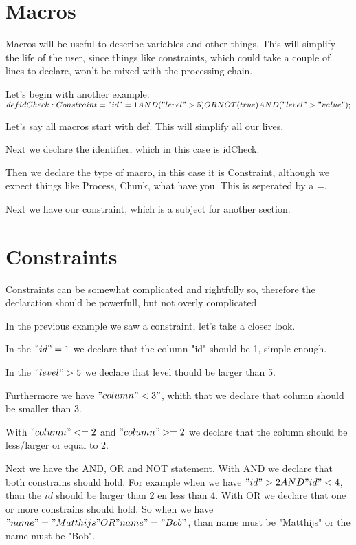 \documentclass[a4paper]{article}
\begin{document}
\section{Macros}
Macros will be useful to describe variables and other things. This will simplify the life of the user, since things like constraints, which could take a couple of lines to declare, won't be mixed with the processing chain.

Let's begin with another example: \\

$def idCheck : Constraint = "id" = 1 AND ("level" > 5) OR NOT(true) AND ("level" > "value");$

Let's say all macros start with def. This will simplify all our lives.

Next we declare the identifier, which in this case is idCheck.

Then we declare the type of macro, in this case it is Constraint, although we expect things like Process, Chunk, what have you. This is seperated by a =.

Next we have our constraint, which is a subject for another section.

\section{Constraints}
Constraints can be somewhat complicated and rightfully so, therefore the declaration should be powerfull, but not overly complicated.

In the previous example we saw a constraint, let's take a closer look.

In the $"id" = 1$ we declare that the column "id" should be 1, simple enough. 

In the $"level" > 5$ we declare that level thould be larger than 5. 

Furthermore we have $"column" < 3"$, whith that we declare that column should be smaller than 3.

With $"column" <= 2$ and $"column" >= 2$ we declare that the column should be less/larger or equal to 2.

Next we have the AND, OR and NOT statement. With AND we declare that both constrains should hold. For example when we have $"id" > 2 AND "id" < 4$, than the $id$ should be larger than 2 en less than 4.
With OR we declare that one or more constrains should hold. So when we have $"name" = "Matthijs" OR "name" = "Bob"$, than name must be "Matthijs" or the name must be "Bob".
\end{document}
